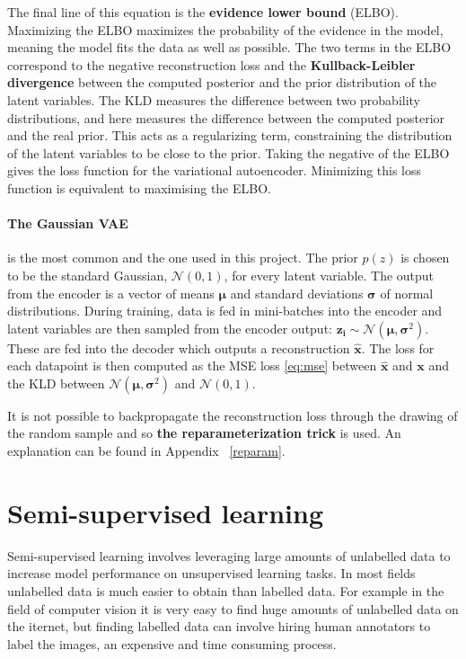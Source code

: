 \documentclass[12pt,a4paper,twoside,openright]{report}
\renewcommand{\vec}[1]{\bm{#1}}
\begin{document}
The final line of this equation is the \textbf{evidence lower bound} (ELBO). Maximizing the ELBO maximizes the probability of the 
evidence in the model, meaning the model fits the data as well as possible. The two terms in the ELBO correspond to the negative 
reconstruction loss and the \textbf{Kullback-Leibler divergence} between the computed posterior and the prior distribution of the latent variables. 
The KLD measures the difference between two probability distributions, and here measures the difference between the computed posterior and
the real prior. This acts as a regularizing term, constraining the distribution of the latent variables to be close to the prior. Taking the 
negative of the ELBO gives the loss function for the variational autoencoder. Minimizing this loss function is equivalent to maximising the ELBO.

\paragraph{The Gaussian VAE}is the most common and the one used in this project. The prior $p(z)$ is chosen to be the standard Gaussian, $\mathcal{N}(0, 1)$,
for every latent variable. The output from the encoder is a vector of means $\vec{\mu}$ and standard deviations $\vec{\sigma}$ of normal distributions. 
During training, data is fed in mini-batches into the encoder and latent variables are then sampled from the encoder output: 
$\vec{z_{i}} \sim \mathcal{N}(\vec{\mu}, \vec{\sigma}^{2})$. These are fed into the decoder which outputs a reconstruction $\vec{\hat{x}}$. The loss 
for each datapoint is then computed as the MSE loss \eqref{eq:mse} between $\vec{\hat{x}}$ and $\vec{x}$ and the KLD between
$\mathcal{N}(\vec{\mu}, \vec{\sigma}^{2})$ and $\mathcal{N}(0, 1)$.

It is not possible to backpropagate the reconstruction loss through the drawing of the random sample and so \textbf{the reparameterization trick} is used. 
An explanation can be found in Appendix ~\ref{reparam}.

\section{Semi-supervised learning}

Semi-supervised learning involves leveraging large amounts of unlabelled data to increase model performance on unsupervised learning tasks. 
In most fields unlabelled data is much easier to obtain than labelled data. For example in the field of computer vision it is very easy to 
find huge amounts of unlabelled data on the iternet, but finding labelled data can involve hiring human annotators to label the images, an 
expensive and time consuming process.
\end{document}

